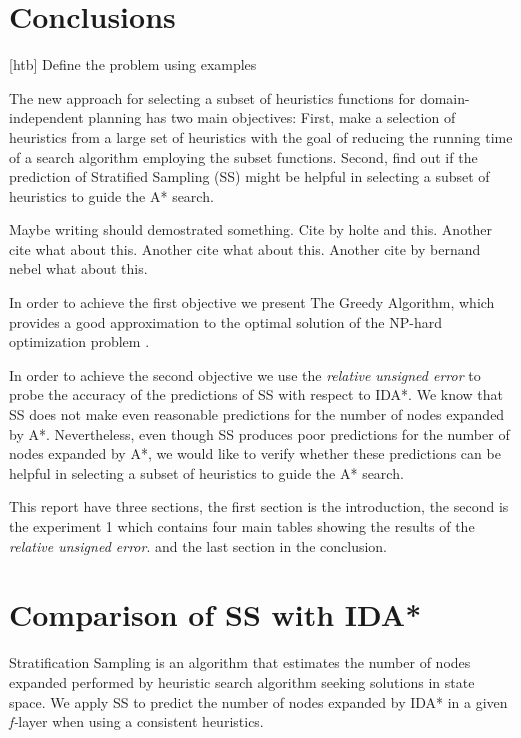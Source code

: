 \documentclass[a4paper,12pt]{article}
\begin{document}
\section{Conclusions}[htb]
Define the problem using examples




The new approach for selecting a subset of heuristics functions for domain-independent planning has two main objectives: First, make a selection of heuristics from a large set of heuristics with the goal of reducing the running time of a search algorithm employing the subset functions. Second, find out if the prediction of Stratified Sampling (SS) might be helpful in selecting a subset of heuristics to guide the A* search.

Maybe writing \citep{krause2012submodular} should demostrated something.
Cite by holte \citep{holte2006maximizing} and this.
Another cite \citep{xu2014solving} what about this.
Another cite \citep{krause2007near} what about this.
Another cite by bernand nebel \citep{backstrom1995complexity} what about this.


In order to achieve the first objective we present The Greedy Algorithm, which provides a good approximation to the optimal solution of the NP-hard optimization problem \citep{krause2012submodular}. 

In order to achieve the second objective we use the \textit{relative unsigned error} to probe the accuracy of the predictions of SS with respect to IDA*. We know that SS does not make even reasonable predictions for the number of nodes expanded by A*. Nevertheless, even though SS produces poor predictions for the number of nodes expanded by A*, we would like to verify whether these predictions can be helpful in selecting a subset of heuristics to guide the A* search.

This report have three sections, the first section is the introduction, the second is the experiment 1 which contains four main tables showing the results of the \textit{relative unsigned error}. and the last section in the conclusion.

\section{Comparison of SS with IDA*}
Stratification Sampling is an algorithm that estimates the number of nodes expanded performed by heuristic search algorithm seeking solutions in state space. We apply SS to predict the number of nodes expanded by IDA* in a given \textit{f-}layer when using a consistent heuristics.
\end{document}

